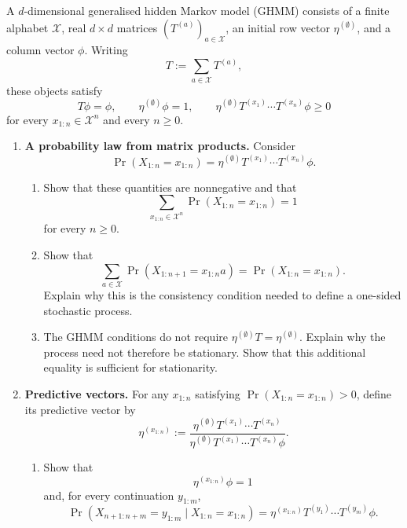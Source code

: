 \documentclass[11pt]{article}
\begin{document}
\begin{exercise}
\label{ex:p3-4}
  A $d$-dimensional generalised hidden Markov model (GHMM) consists of a
  finite alphabet $\mathcal X$, real $d\times d$ matrices
  $(T^{(a)})_{a\in\mathcal X}$, an initial row vector
  $\eta^{(\emptyset)}$, and a column vector $\phi$. Writing
  \[
    T:=\sum_{a\in\mathcal X}T^{(a)},
  \]
  these objects satisfy
  \[
    T\phi=\phi,\qquad
    \eta^{(\emptyset)}\phi=1,\qquad
    \eta^{(\emptyset)}T^{(x_1)}\cdots T^{(x_n)}\phi\geq0
  \]
  for every $x_{1:n}\in\mathcal X^n$ and every $n\geq0$.

  \begin{enumerate}
    \item \textbf{A probability law from matrix products.}
      Consider
      \[
        \Pr(X_{1:n}=x_{1:n})
          =\eta^{(\emptyset)}
            T^{(x_1)}\cdots T^{(x_n)}\phi.
      \]
      \begin{enumerate}
        \item Show that these quantities are nonnegative and that
          \[
            \sum_{x_{1:n}\in\mathcal X^n}
              \Pr(X_{1:n}=x_{1:n})=1
          \]
          for every $n\geq0$.

        \item Show that
          \[
            \sum_{a\in\mathcal X}
              \Pr(X_{1:n+1}=x_{1:n}a)
              =\Pr(X_{1:n}=x_{1:n}).
          \]
          Explain why this is the consistency condition needed to define a
          one-sided stochastic process.

        \item The GHMM conditions do not require
          $\eta^{(\emptyset)}T=\eta^{(\emptyset)}$. Explain why the process
          need not therefore be stationary. Show that this additional
          equality is sufficient for stationarity.
      \end{enumerate}

    \item \textbf{Predictive vectors.}
      For any $x_{1:n}$ satisfying
      $\Pr(X_{1:n}=x_{1:n})>0$, define its predictive vector by
      \[
        \eta^{(x_{1:n})}
          :=\frac{\eta^{(\emptyset)}
              T^{(x_1)}\cdots T^{(x_n)}}
            {\eta^{(\emptyset)}
              T^{(x_1)}\cdots T^{(x_n)}\phi}.
      \]
      \begin{enumerate}
        \item Show that
          \[
            \eta^{(x_{1:n})}\phi=1
          \]
          and, for every continuation $y_{1:m}$,
          \[
            \Pr(X_{n+1:n+m}=y_{1:m}\mid X_{1:n}=x_{1:n})
              =\eta^{(x_{1:n})}
                T^{(y_1)}\cdots T^{(y_m)}\phi.
          \]


\end{enumerate}
\end{enumerate}
\end{exercise}
\end{document}
